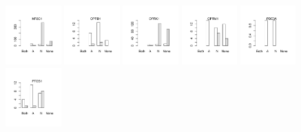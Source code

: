 \documentclass[utf8]{frontiersSCNS} %
\begin{document}
\begin{figure}[h!]
\vspace*{-15pt} %
\includegraphics[width=0.19\textwidth]{figures/validation_plots/nr3c1_0p8_valplot.pdf}
\includegraphics[width=0.19\textwidth]{figures/validation_plots/oprd1_0p8_valplot.pdf}
\includegraphics[width=0.19\textwidth]{figures/validation_plots/oprk1_0p8_valplot.pdf}
\includegraphics[width=0.19\textwidth]{figures/validation_plots/oprm1_0p8_valplot.pdf}
\includegraphics[width=0.19\textwidth]{figures/validation_plots/pde3a_0p8_valplot.pdf}
\vspace*{-15pt} %
\includegraphics[width=0.19\textwidth]{figures/validation_plots/ptgs1_0p8_valplot.pdf}

\end{figure}
\end{document}
